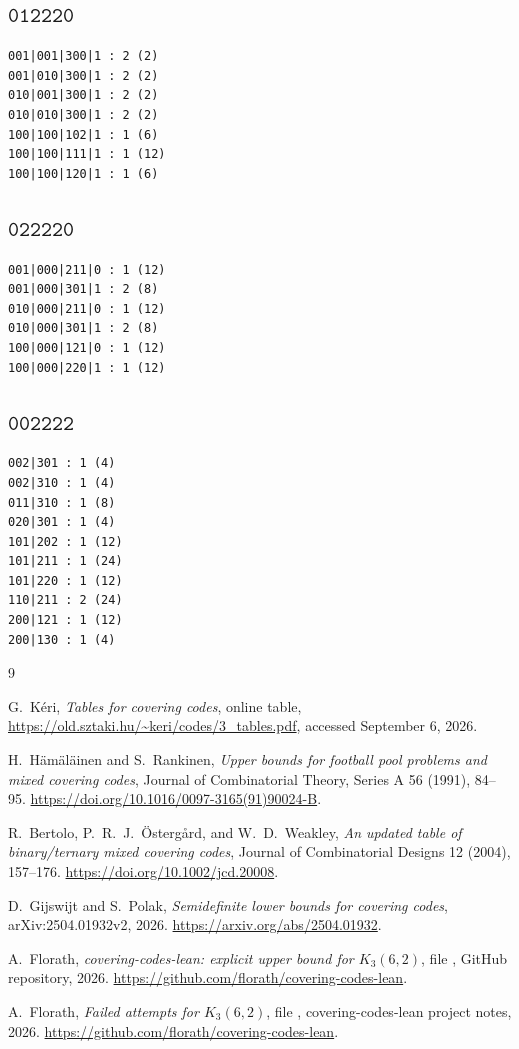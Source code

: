 \documentclass[11pt]{article}
\newcommand{\codeword}[1]{\texttt{#1}}
\begin{document}
\subsection*{\(\codeword{012220}\)}
\begin{Verbatim}[fontsize=\small]
001|001|300|1 : 2 (2)
001|010|300|1 : 2 (2)
010|001|300|1 : 2 (2)
010|010|300|1 : 2 (2)
100|100|102|1 : 1 (6)
100|100|111|1 : 1 (12)
100|100|120|1 : 1 (6)
\end{Verbatim}

\subsection*{\(\codeword{022220}\)}
\begin{Verbatim}[fontsize=\small]
001|000|211|0 : 1 (12)
001|000|301|1 : 2 (8)
010|000|211|0 : 1 (12)
010|000|301|1 : 2 (8)
100|000|121|0 : 1 (12)
100|000|220|1 : 1 (12)
\end{Verbatim}

\subsection*{\(\codeword{002222}\)}
\begin{Verbatim}[fontsize=\small]
002|301 : 1 (4)
002|310 : 1 (4)
011|310 : 1 (8)
020|301 : 1 (4)
101|202 : 1 (12)
101|211 : 1 (24)
101|220 : 1 (12)
110|211 : 2 (24)
200|121 : 1 (12)
200|130 : 1 (4)
\end{Verbatim}

\begin{thebibliography}{9}

G.~K\'eri,
\emph{Tables for covering codes},
online table,
\url{https://old.sztaki.hu/~keri/codes/3_tables.pdf},
accessed September 6, 2026.

H.~H\"am\"al\"ainen and S.~Rankinen,
\emph{Upper bounds for football pool problems and mixed covering codes},
Journal of Combinatorial Theory, Series A 56 (1991), 84--95.
\url{https://doi.org/10.1016/0097-3165(91)90024-B}.

R.~Bertolo, P.~R.~J.~\"Osterg{\aa}rd, and W.~D.~Weakley,
\emph{An updated table of binary/ternary mixed covering codes},
Journal of Combinatorial Designs 12 (2004), 157--176.
\url{https://doi.org/10.1002/jcd.20008}.

D.~Gijswijt and S.~Polak,
\emph{Semidefinite lower bounds for covering codes},
arXiv:2504.01932v2, 2026.
\url{https://arxiv.org/abs/2504.01932}.

A.~Florath,
\emph{covering-codes-lean: explicit upper bound for \(K_3(6,2)\)},
file ,
GitHub repository, 2026.
\url{https://github.com/florath/covering-codes-lean}.

A.~Florath,
\emph{Failed attempts for \(K_3(6,2)\)},
file ,
covering-codes-lean project notes, 2026.
\url{https://github.com/florath/covering-codes-lean}.

\end{thebibliography}
\end{document}
